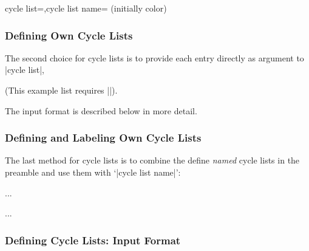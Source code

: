 \begin{pgfplotskeylist}{cycle list=,cycle list name= (initially color)}
    \subsubsection{Defining Own Cycle Lists}

    The second choice for cycle lists is to provide each entry directly as
    argument to |cycle list|,
\begin{codeexample}[]
\end{codeexample}
    (This example list requires |\usetikzlibrary{plotmarks}|).

    The input format is described below in more detail.


    \subsubsection{Defining and Labeling Own Cycle Lists}

    The last method for cycle lists is to combine the define \emph{named} cycle
    lists in the preamble and use them with `|cycle list name|':
    \begin{command}{\pgfplotscreateplotcyclelist{}}%
    \end{command}
\begin{codeexample}
...
\begin{axis}[cycle list name=mylist]
    ...
\end{axis}
\end{codeexample}


    \subsubsection{Defining Cycle Lists: Input Format}


\end{pgfplotskeylist}
